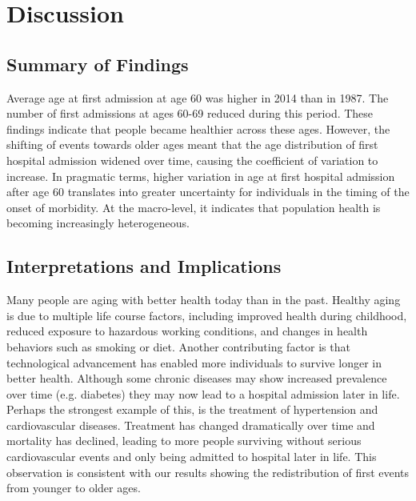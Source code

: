 

\section{Discussion}

\subsection{Summary of Findings}

Average age at first admission at age 60 was higher in 2014 than in 1987. 
The number of first admissions at ages 60-69 reduced during this period. These 
findings indicate that people became healthier across these ages. However, 
the shifting of events towards older ages meant that the age distribution of 
first hospital admission widened over time, causing the coefficient of variation 
to increase. In pragmatic terms, higher variation in age at first hospital 
admission after age 60 translates into greater uncertainty for individuals 
in the timing of the onset of morbidity. At the macro-level, it indicates 
that population health is becoming increasingly heterogeneous.\\


\subsection{Interpretations and Implications}

Many people are aging with better health today than in the past. Healthy aging 
is due to multiple life course factors, including improved health during childhood, 
reduced exposure to hazardous working conditions, and changes in health behaviors 
such as smoking or diet.\citep{vaupel2010biodemography,brandt2012tracing} 
Another contributing factor is that technological advancement has enabled 
more individuals to survive longer in better health. Although some chronic 
diseases may show increased prevalence over time (e.g. diabetes) they may 
now lead to a hospital admission later in life. Perhaps the strongest example 
of this, is the treatment of hypertension and cardiovascular diseases.\citep{blacher2016epidemiological} 
Treatment has changed dramatically over time and mortality has declined, leading 
to more people surviving without serious cardiovascular events and only being 
admitted to hospital later in life. This observation is consistent with our 
results showing the redistribution of first events from younger to older ages.

